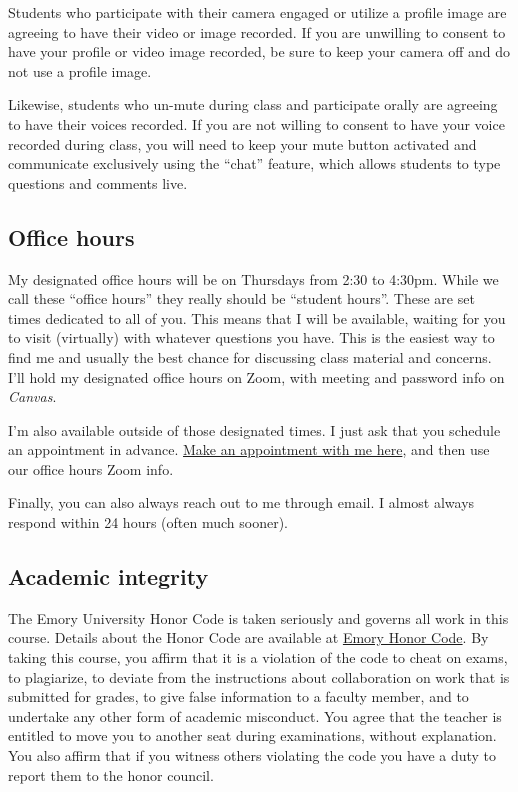 \documentclass[11pt,]{article}
\begin{document}
Students who participate with their camera engaged or utilize a profile
image are agreeing to have their video or image recorded. If you are
unwilling to consent to have your profile or video image recorded, be
sure to keep your camera off and do not use a profile image.

Likewise, students who un-mute during class and participate orally are
agreeing to have their voices recorded. If you are not willing to
consent to have your voice recorded during class, you will need to keep
your mute button activated and communicate exclusively using the
``chat'' feature, which allows students to type questions and comments
live.

\hypertarget{office-hours}{%
\subsection{Office hours}\label{office-hours}}

My designated office hours will be on Thursdays from 2:30 to 4:30pm.
While we call these ``office hours'' they really should be ``student
hours''. These are set times dedicated to all of you. This means that I
will be available, waiting for you to visit (virtually) with whatever
questions you have. This is the easiest way to find me and usually the
best chance for discussing class material and concerns. I'll hold my
designated office hours on Zoom, with meeting and password info on
\emph{Canvas}.

I'm also available outside of those designated times. I just ask that
you schedule an appointment in advance.
\href{https://mccarthy-meetings.youcanbook.me/}{Make an appointment with
me here}, and then use our office hours Zoom info.

Finally, you can also always reach out to me through email. I almost
always respond within 24 hours (often much sooner).

\hypertarget{academic-integrity}{%
\subsection{Academic integrity}\label{academic-integrity}}

The Emory University Honor Code is taken seriously and governs all work
in this course. Details about the Honor Code are available at
\href{http://catalog.college.emory.edu/academic/policies-regulations/honor-code.html}{Emory
Honor Code}. By taking this course, you affirm that it is a violation of
the code to cheat on exams, to plagiarize, to deviate from the
instructions about collaboration on work that is submitted for grades,
to give false information to a faculty member, and to undertake any
other form of academic misconduct. You agree that the teacher is
entitled to move you to another seat during examinations, without
explanation. You also affirm that if you witness others violating the
code you have a duty to report them to the honor council.
\end{document}
